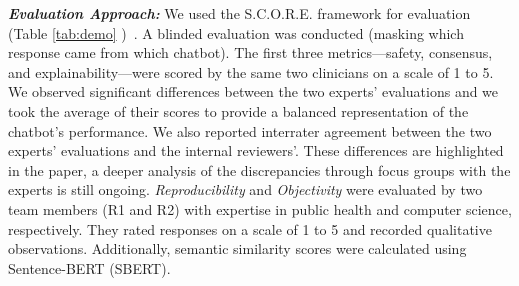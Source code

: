 \textbf{\textit{Evaluation Approach:}}
We used the S.C.O.R.E. framework for evaluation (Table \ref{tab:demo}
)~\cite{tan2024proposed}. A blinded evaluation was conducted (masking which response came from which chatbot). The first three metrics—safety, consensus, and explainability—were scored by the same two clinicians on a scale of 1 to 5.
We observed significant differences between the two experts' evaluations and we took the average of their scores to provide a balanced representation of the chatbot's performance. We also reported interrater agreement between the two experts' evaluations and the internal reviewers'. These differences are highlighted in the paper, a deeper analysis of the discrepancies through focus groups with the experts is still ongoing.
\textit{Reproducibility} and \textit{Objectivity} were evaluated by two team members (R1 and R2) with expertise in public health and computer science, respectively. They rated responses on a scale of 1 to 5 and recorded qualitative observations. Additionally, semantic similarity scores were calculated using Sentence-BERT (SBERT).

